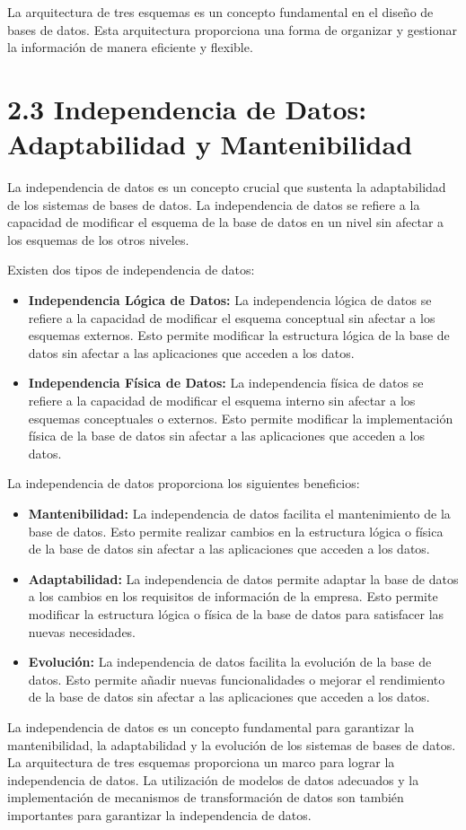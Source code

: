 La arquitectura de tres esquemas es un concepto fundamental en el diseño de bases de datos. Esta arquitectura proporciona una forma de organizar y gestionar la información de manera eficiente y flexible.

\section{2.3 Independencia de Datos: Adaptabilidad y Mantenibilidad}

La independencia de datos es un concepto crucial que sustenta la adaptabilidad de los sistemas de bases de datos. La independencia de datos se refiere a la capacidad de modificar el esquema de la base de datos en un nivel sin afectar a los esquemas de los otros niveles.

Existen dos tipos de independencia de datos:

\begin{itemize}
    \item \textbf{Independencia Lógica de Datos:} La independencia lógica de datos se refiere a la capacidad de modificar el esquema conceptual sin afectar a los esquemas externos. Esto permite modificar la estructura lógica de la base de datos sin afectar a las aplicaciones que acceden a los datos.
    \item \textbf{Independencia Física de Datos:} La independencia física de datos se refiere a la capacidad de modificar el esquema interno sin afectar a los esquemas conceptuales o externos. Esto permite modificar la implementación física de la base de datos sin afectar a las aplicaciones que acceden a los datos.
\end{itemize}

La independencia de datos proporciona los siguientes beneficios:

\begin{itemize}
    \item \textbf{Mantenibilidad:} La independencia de datos facilita el mantenimiento de la base de datos. Esto permite realizar cambios en la estructura lógica o física de la base de datos sin afectar a las aplicaciones que acceden a los datos.
    \item \textbf{Adaptabilidad:} La independencia de datos permite adaptar la base de datos a los cambios en los requisitos de información de la empresa. Esto permite modificar la estructura lógica o física de la base de datos para satisfacer las nuevas necesidades.
    \item \textbf{Evolución:} La independencia de datos facilita la evolución de la base de datos. Esto permite añadir nuevas funcionalidades o mejorar el rendimiento de la base de datos sin afectar a las aplicaciones que acceden a los datos.
\end{itemize}

La independencia de datos es un concepto fundamental para garantizar la mantenibilidad, la adaptabilidad y la evolución de los sistemas de bases de datos. La arquitectura de tres esquemas proporciona un marco para lograr la independencia de datos. La utilización de modelos de datos adecuados y la implementación de mecanismos de transformación de datos son también importantes para garantizar la independencia de datos.
